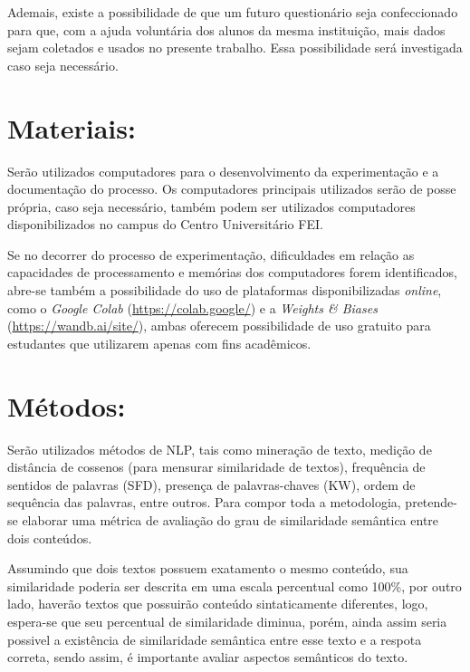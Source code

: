 Ademais, existe a possibilidade de que um futuro questionário seja confeccionado para que, com a ajuda voluntária dos alunos da mesma instituição, mais dados sejam coletados e usados no presente trabalho. Essa possibilidade será investigada caso seja necessário.


\section{Materiais:}
Serão utilizados computadores para o desenvolvimento da experimentação e a documentação do processo. Os computadores principais utilizados serão de posse própria, caso seja necessário, também podem ser utilizados computadores disponibilizados no campus do Centro Universitário FEI. 

Se no decorrer do processo de experimentação, dificuldades em relação as capacidades de processamento e memórias dos computadores forem identificados, abre-se também a possibilidade do uso de plataformas disponibilizadas \textit{online}, como o \textit{Google Colab} (\url{https://colab.google/}) e a \textit{Weights \& Biases} (\url{https://wandb.ai/site/}), ambas oferecem possibilidade de uso gratuito para estudantes que utilizarem apenas com fins acadêmicos.

\section{Métodos:}
Serão utilizados métodos de NLP, tais como mineração de texto, medição de distância de cossenos (para mensurar similaridade de textos), frequência de sentidos de palavras (SFD), presença de palavras-chaves (KW), ordem de sequência das palavras, entre outros. Para compor toda a metodologia, pretende-se elaborar uma métrica de avaliação do grau de similaridade semântica entre dois conteúdos. 

Assumindo que dois textos possuem exatamento o mesmo conteúdo, sua similaridade poderia ser descrita em uma escala percentual como 100\%, por outro lado, haverão textos que possuirão conteúdo sintaticamente diferentes, logo, espera-se que seu percentual de similaridade diminua, porém, ainda assim seria possivel a existência de similaridade semântica entre esse texto e a respota correta, sendo assim, é importante avaliar aspectos semânticos do texto. 

